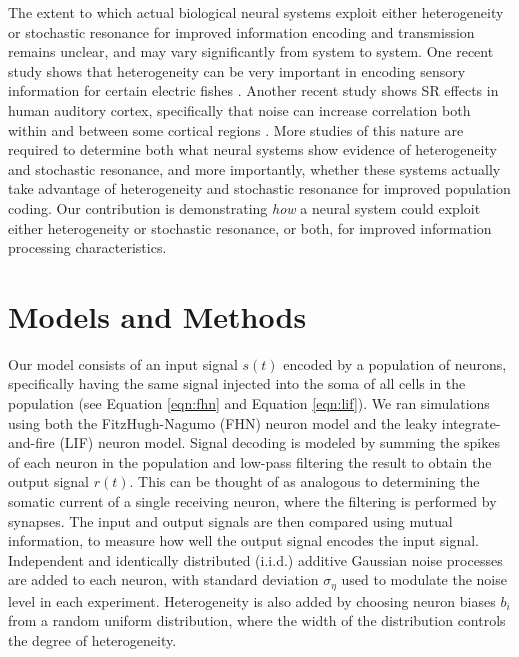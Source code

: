 \documentclass[12pt]{article}
\newcommand{\eqn}[1]{Equation \ref{eqn:#1}}
\newcommand{\scnlabel}[1]{\label{scn:#1}}
\begin{document}
The extent to which actual biological neural systems exploit either heterogeneity or stochastic resonance for improved information encoding and transmission remains unclear, and may vary significantly from system to system. One recent study shows that heterogeneity can be very important in encoding sensory information for certain electric fishes \citep{Marsat2010}. Another recent study shows SR effects in human auditory cortex, specifically that noise can increase correlation both within and between some cortical regions \citep{Ward2010}. More studies of this nature are required to determine both what neural systems show evidence of heterogeneity and stochastic resonance, and more importantly, whether these systems actually take advantage of heterogeneity and stochastic resonance for improved population coding. Our contribution is demonstrating \emph{how} a neural system could exploit either heterogeneity or stochastic resonance, or both, for improved information processing characteristics.

\section{Models and Methods}
\scnlabel{methods}

Our model consists of an input signal $s(t)$ encoded by a population of neurons, specifically having the same signal injected into the soma of all cells in the population (see \eqn{fhn} and \eqn{lif}). We ran simulations using both the FitzHugh-Nagumo (FHN) neuron model and the leaky integrate-and-fire (LIF) neuron model. Signal decoding is modeled by summing the spikes of each neuron in the population and low-pass filtering the result to obtain the output signal $r(t)$. This can be thought of as analogous to determining the somatic current of a single receiving neuron, where the filtering is performed by synapses. The input and output signals are then compared using mutual information, to measure how well the output signal encodes the input signal. Independent and identically distributed (i.i.d.) additive Gaussian noise processes are added to each neuron, with standard deviation $\sigma_\eta$ used to modulate the noise level in each experiment. Heterogeneity is also added by choosing neuron biases $b_i$ from a random uniform distribution, where the width of the distribution controls the degree of heterogeneity.
\end{document}
